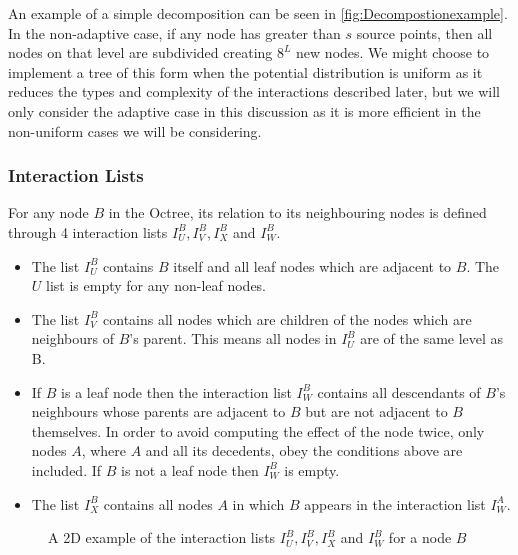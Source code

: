 An example of a simple decomposition can be seen in \cref{fig:Decompostionexample}. In the non-adaptive case, if any node has greater than $s$ source points, then all nodes on that level are subdivided creating $8^L$ new nodes. We might choose to implement a tree of this form when the potential distribution is uniform as it reduces the types and complexity of the interactions described later, but we will only consider the adaptive case in this discussion as it is more efficient in the non-uniform cases we will be considering.

\subsubsection{Interaction Lists}
For any node $B$ in the Octree, its relation to its neighbouring nodes is defined through 4 interaction lists $I_U^B, I_V^B, I_X^B$ and $I_W^B$.

\begin{itemize}
\item The list $I^B_U$ contains $B$ itself and all leaf nodes which are adjacent to $B$. The $U$ list is empty for any non-leaf nodes.

\item The list $I_V^B$ contains all nodes which are children of the nodes which are neighbours of $B$'s parent. This means all nodes in $I_U^B$ are of the same level as B.

\item If $B$ is a leaf node then the interaction list $I_W^B$ contains all descendants of $B$'s neighbours whose parents are adjacent to $B$ but are not adjacent to $B$ themselves. In order to avoid computing the effect of the node twice, only nodes $A$, where $A$ and all its decedents, obey the conditions above are included. If $B$ is not a leaf node then $I_W^B$ is empty.

\item The list $I_X^B$ contains all nodes $A$ in which $B$ appears in the interaction list $I_W^A$.
\end{itemize}

\begin{figure}
    \centering
    \resizebox{.5\linewidth}{!}{}
    \caption{A 2D example of the interaction lists $I_U^B, I_V^B, I_X^B$ and $I_W^B$ for a node $B$}
    \label{fig:InteractionsLists}
\end{figure}


